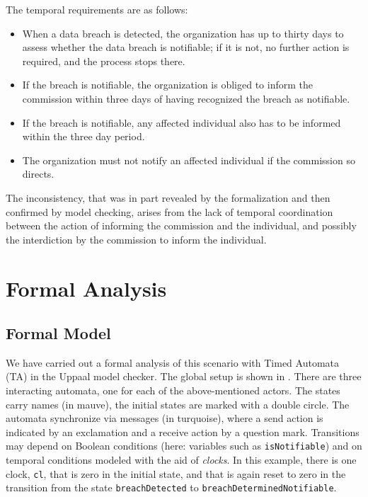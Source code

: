 The temporal requirements are as follows:
\begin{itemize}
\item When a data breach is detected, the organization has up to thirty days to
  assess whether the data breach is notifiable; if it is not, no further
  action is required, and the process stops there. 
\item If the breach is notifiable, the organization is obliged to inform the
  commission within three days of having recognized the breach as notifiable.
\item If the breach is notifiable, any affected individual also has to be
  informed within the three day period.
\item The organization must not notify an affected individual if the
  commission so directs.
\end{itemize}

The inconsistency, that was in part revealed by the formalization and then
confirmed by model checking, arises from the lack of temporal coordination
between the action of informing the commission and the individual, and
possibly the interdiction by the commission to inform the individual.


\section{Formal Analysis}\label{sec:formal_analysis}

\subsection{Formal Model}\label{sec:formal_model}

We have carried out a formal analysis of this scenario with Timed Automata
(TA) in the Uppaal \cite{larsen1997uppaal} model checker. The global setup is
shown in . There are three interacting automata, one for each
of the above-mentioned actors. The states carry names (in mauve), the initial
states are marked with a double circle. The automata synchronize via messages
(in turquoise), where a send action is indicated by an exclamation and a
receive action by a question mark. Transitions may depend on Boolean
conditions (here: variables such as \texttt{isNotifiable}) and on temporal
conditions modeled with the aid of \emph{clocks}. In this example, there is
one clock, \texttt{cl}, that is zero in the initial state, and that is again
reset to zero in the transition from the state \texttt{breachDetected} to
\texttt{breachDeterminedNotifiable}.


